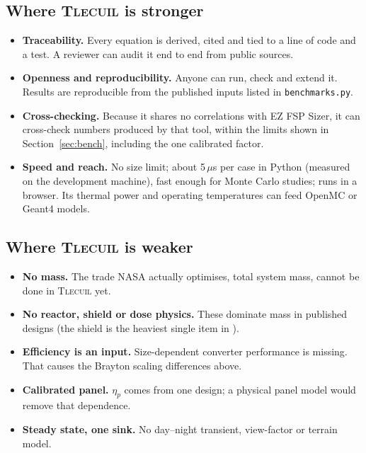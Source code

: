 \documentclass[11pt]{article}
\numberwithin{equation}{section}
\numberwithin{table}{section}
\newcommand{\tlecuil}{\textsc{Tlecuil}}
\begin{document}
\subsection{Where \tlecuil{} is stronger}
\begin{itemize}
  \item \textbf{Traceability.} Every equation is derived, cited and tied to a line of
        code and a test. A reviewer can audit it end to end from public sources.
  \item \textbf{Openness and reproducibility.} Anyone can run, check and extend it.
        Results are reproducible from the published inputs listed in
        \texttt{benchmarks.py}.
  \item \textbf{Cross-checking.} Because it shares no correlations with EZ FSP Sizer,
        it can cross-check numbers produced by that tool, within the limits shown in
        Section~\ref{sec:bench}, including the one calibrated factor.
  \item \textbf{Speed and reach.} No size limit; about 5\,$\mu$s per case in Python
        (measured on the development machine), fast enough for Monte Carlo studies;
        runs in a browser. Its thermal power and operating temperatures can feed OpenMC
        or Geant4 models.
\end{itemize}

\subsection{Where \tlecuil{} is weaker}
\begin{itemize}
  \item \textbf{No mass.} The trade NASA actually optimises, total system mass,
        cannot be done in \tlecuil{} yet.
  \item \textbf{No reactor, shield or dose physics.} These dominate mass in published
        designs (the shield is the heaviest single item in \cite{mason2011arch}).
  \item \textbf{Efficiency is an input.} Size-dependent converter performance is
        missing. That causes the Brayton scaling differences above.
  \item \textbf{Calibrated panel.} $\eta_p$ comes from one design; a physical panel model
        would remove that dependence.
  \item \textbf{Steady state, one sink.} No day--night transient, view-factor or terrain
        model.
\end{itemize}
\end{document}
